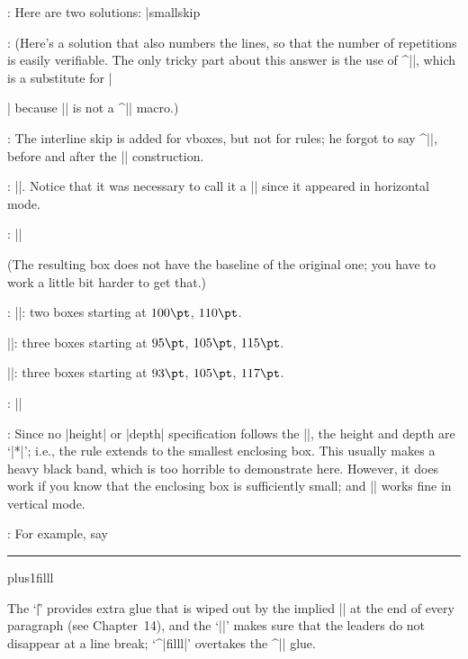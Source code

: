 {{{{{{{{{{{{{:
 Here are two solutions:
\begintt
\def\next#1\endname{\uppercase{\def\MYNAME{#1}}}
\expandafter\next\myname\endname
|smallskip\edef\next{\def\noexpand\MYNAME{\myname}}
\uppercase\expandafter{\next}
\endtt

:
 (Here's a solution that also numbers the lines, so that the number of
repetitions is easily verifiable.
The only tricky part about this answer is the use of\/ ^|\endgraf|,
which is a substitute for |\par| because |\loop| is not a ^|\long| macro.)
\begintt
\newcount\n
\def\punishment#1#2{\n=0
  \loop\ifnum\n<#2 \advance\n by1
    \item{\number\n.}#1\endgraf\repeat}
\endtt

:
 The interline skip is added for vboxes, but not for rules; he
forgot to say ^|\nointerlineskip|, before and after the |\moveright|
construction.

:
 |\vrule height3pt depth-2pt width1in|. Notice that it was necessary
to call it a |\vrule| since it appeared in horizontal mode.

:
 |\def\boxit#1{\vbox{\hrule\hbox{\vrule\kern3pt|\parbreak
        |      \vbox{\kern3pt#1\kern3pt}\kern3pt\vrule}\hrule}}|\par
\smallskip\noindent
(The resulting box does not have the baseline of the original one;
you have to work a little bit harder to get that.)

:
 |\leaders|: two boxes starting at $100\pt$, $110\pt$.\par
|\cleaders|: three boxes starting at $95\pt$, $105\pt$, $115\pt$.\par
|\xleaders|: three boxes starting at $93\pt$, $105\pt$, $117\pt$.

:
 |\def\leaderfill{\kern-0.3em\leaders\hbox to 1em{\hss.\hss}%
        |    \hskip0.6em plus1fill \kern-0.3em }|

:
 Since no |height| or |depth| specification follows the |\vrule|,
the height and depth are `|*|'; i.e., the rule extends to the smallest
enclosing box. This usually makes a heavy black band, which is too
horrible to demonstrate here. However, it does work if you know that the
enclosing box is sufficiently small; and |\leaders\vrule\vfill| works fine in
vertical mode.

:
 For example, say
\begintt
\null\nobreak\leaders\hrule\hskip10pt plus1filll\ \par
\endtt
The `|\|\]' provides extra glue that is wiped out by the implied |\unskip|
at the end of every paragraph (see Chapter~14), and the `|\null\nobreak|'
makes sure that the leaders do not disappear at a line break; `^|filll|'
overtakes the ^|\parfillskip| glue.

}}}}}}}}}}}}}
